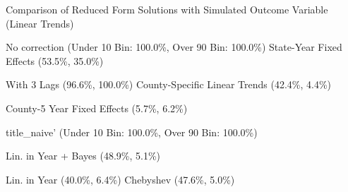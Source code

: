 \caption{Comparison of Reduced Form Solutions with Simulated Outcome Variable (Linear Trends) \label{fig:distributions-existing-solutions}}
\caption*{\color{p1line}{\textbf{\textemdash\textemdash}} No correction (Under 10 Bin: 100.0\%, Over 90 Bin: 100.0\%) \hspace{1cm} \color{p2line}{- - -} State-Year Fixed Effects (53.5\%, 35.0\%)}
\caption*{\color{p3line}{\textbf{- - -}} With 3 Lags (96.6\%, 100.0\%) \hspace{1cm} \color{p4line}{\textbf{- - -}} County-Specific Linear Trends (42.4\%, 4.4\%)}
\caption*{\color{p5line}{\textbf{- - -}} County-5 Year Fixed Effects (5.7\%, 6.2\%)}


\caption*{\color{p1line}{\textbf{\textemdash\textemdash}} title_naive' (Under 10 Bin: 100.0\%, Over 90 Bin: 100.0\%)}
\caption*{\color{p2line}{\textbf{- - -}} Lin. in Year + Bayes (48.9\%, 5.1\%)}
\caption*{\color{p3line}{\textbf{- - -}} Lin. in Year (40.0\%, 6.4\%) \hspace{1cm} \color{p4line}{\textbf{- - -}} Chebyshev (47.6\%, 5.0\%)}